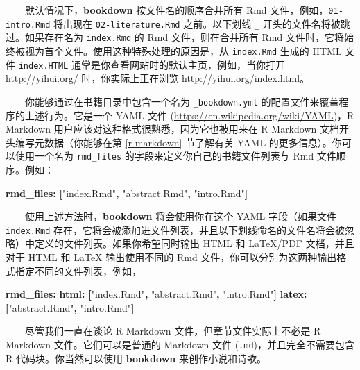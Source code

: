 \documentclass[
  12pt,
]{krantz}
\newenvironment{Shaded}{\begin{snugshade}}{\end{snugshade}}
\newcommand{\AttributeTok}[1]{\textcolor[rgb]{0.13,0.29,0.53}{#1}}
\newcommand{\FunctionTok}[1]{\textcolor[rgb]{0.13,0.29,0.53}{\textbf{#1}}}
\newcommand{\KeywordTok}[1]{\textcolor[rgb]{0.13,0.29,0.53}{\textbf{#1}}}
\newcommand{\StringTok}[1]{\textcolor[rgb]{0.31,0.60,0.02}{#1}}
\theoremstyle{definition}
\theoremstyle{definition}
\theoremstyle{definition}
\theoremstyle{definition}
\theoremstyle{remark}
\begin{document}
  默认情况下，\textbf{bookdown} 按文件名的顺序合并所有 Rmd 文件，例如，\texttt{01-intro.Rmd} 将出现在 \texttt{02-literature.Rmd} 之前。以下划线 \texttt{\_} 开头的文件名将被跳过。如果存在名为 \texttt{index.Rmd} 的 Rmd 文件，则在合并所有 Rmd 文件时，它将始终被视为首个文件。使用这种特殊处理的原因是，从 \texttt{index.Rmd} 生成的 HTML 文件 \texttt{index.HTML} 通常是你查看网站时的默认主页，例如，当你打开 \url{http://yihui.org/} 时，你实际上正在浏览 \url{http://yihui.org/index.html}。

  你能够通过在书籍目录中包含一个名为 \texttt{\_bookdown.yml} 的配置文件来覆盖程序的上述行为。它是一个 YAML 文件 (\url{https://en.wikipedia.org/wiki/YAML})，R Markdown 用户应该对这种格式很熟悉，因为它也被用来在 R Markdown 文档开头编写元数据（你能够在第 \ref{r-markdown} 节了解有关 YAML 的更多信息）。你可以使用一个名为 \texttt{rmd\_files} 的字段来定义你自己的书籍文件列表与 Rmd 文件顺序。例如：

\begin{Shaded}
\begin{Highlighting}[]
\FunctionTok{rmd\_files}\KeywordTok{:}\AttributeTok{ }\KeywordTok{[}\StringTok{"index.Rmd"}\KeywordTok{,}\AttributeTok{ }\StringTok{"abstract.Rmd"}\KeywordTok{,}\AttributeTok{ }\StringTok{"intro.Rmd"}\KeywordTok{]}
\end{Highlighting}
\end{Shaded}

  使用上述方法时，\textbf{bookdown} 将会使用你在这个 YAML 字段（如果文件 \texttt{index.Rmd} 存在，它将会被添加进文件列表，并且以下划线命名的文件名将会被忽略）中定义的文件列表。如果你希望同时输出 HTML 和 LaTeX/PDF 文档，并且对于 HTML 和 LaTeX 输出使用不同的 Rmd 文件，你可以分别为这两种输出格式指定不同的文件列表，例如，

\begin{Shaded}
\begin{Highlighting}[]
\FunctionTok{rmd\_files}\KeywordTok{:}
\AttributeTok{  }\FunctionTok{html}\KeywordTok{:}\AttributeTok{ }\KeywordTok{[}\StringTok{"index.Rmd"}\KeywordTok{,}\AttributeTok{ }\StringTok{"abstract.Rmd"}\KeywordTok{,}\AttributeTok{ }\StringTok{"intro.Rmd"}\KeywordTok{]}
\AttributeTok{  }\FunctionTok{latex}\KeywordTok{:}\AttributeTok{ }\KeywordTok{[}\StringTok{"abstract.Rmd"}\KeywordTok{,}\AttributeTok{ }\StringTok{"intro.Rmd"}\KeywordTok{]}
\end{Highlighting}
\end{Shaded}

  尽管我们一直在谈论 R Markdown 文件，但章节文件实际上不必是 R Markdown 文件。它们可以是普通的 Markdown 文件 (\texttt{.md})，并且完全不需要包含 R 代码块。你当然可以使用 \textbf{bookdown} 来创作小说和诗歌。
\end{document}
